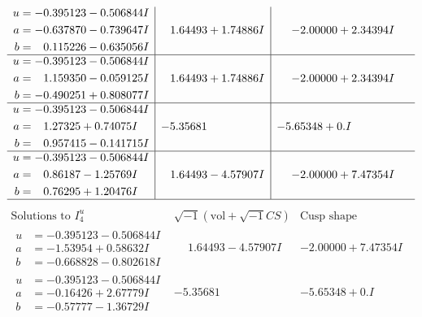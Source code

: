 \documentclass[1p]{elsarticle_modified}
\theoremstyle{definition}
\newcommand{\I}{\sqrt{-1}}
\begin{document}
$$\begin{array}{c|c|c}
\begin{aligned}
u &= -0.395123 - 0.506844 I \\
a &= -0.637870 - 0.739647 I \\
b &= \phantom{-}0.115226 - 0.635056 I\end{aligned}
 & \phantom{-}1.64493 + 1.74886 I & -2.00000 + 2.34394 I \\ \hline\begin{aligned}
u &= -0.395123 - 0.506844 I \\
a &= \phantom{-}1.159350 - 0.059125 I \\
b &= -0.490251 + 0.808077 I\end{aligned}
 & \phantom{-}1.64493 + 1.74886 I & -2.00000 + 2.34394 I \\ \hline\begin{aligned}
u &= -0.395123 - 0.506844 I \\
a &= \phantom{-}1.27325 + 0.74075 I \\
b &= \phantom{-}0.957415 - 0.141715 I\end{aligned}
 & -5.35681\phantom{ +0.000000I} & -5.65348 + 0. I\phantom{ +0.000000I} \\ \hline\begin{aligned}
u &= -0.395123 - 0.506844 I \\
a &= \phantom{-}0.86187 - 1.25769 I \\
b &= \phantom{-}0.76295 + 1.20476 I\end{aligned}
 & \phantom{-}1.64493 - 4.57907 I & -2.00000 + 7.47354 I\\
 \hline 
 \end{array}$$\newpage$$\begin{array}{c|c|c}  
\text{Solutions to }I^u_{4}& \I (\text{vol} + \sqrt{-1}CS) & \text{Cusp shape}\\
 \hline 
\begin{aligned}
u &= -0.395123 - 0.506844 I \\
a &= -1.53954 + 0.58632 I \\
b &= -0.668828 - 0.802618 I\end{aligned}
 & \phantom{-}1.64493 - 4.57907 I & -2.00000 + 7.47354 I \\ \hline\begin{aligned}
u &= -0.395123 - 0.506844 I \\
a &= -0.16426 + 2.67779 I \\
b &= -0.57777 - 1.36729 I\end{aligned}
 & -5.35681\phantom{ +0.000000I} & -5.65348 + 0. I\phantom{ +0.000000I} \\ \hline\begin{aligned}

\end{aligned}
\end{array}$$
\end{document}
